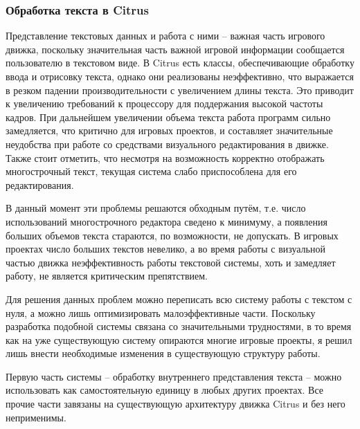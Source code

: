 \documentclass{fefu}
\begin{document}
			\subsubsection{Обработка текста в Citrus}
				\par Представление текстовых данных и работа с ними -- важная часть игрового
				движка, поскольку значительная часть важной игровой информации сообщается 
				пользователю в текстовом виде. 
				В Citrus есть классы, обеспечивающие обработку ввода и отрисовку текста, 
				однако они реализованы неэффективно, что выражается в резком падении 
				производительности с увеличением длины текста. Это приводит к увеличению
				требований к процессору для поддержания высокой частоты кадров. При дальнейшем
				увеличении объема текста работа программ сильно замедляется, что критично для
				игровых проектов, и составляет значительные неудобства при работе со средствами
				визуального редактирования в движке. Также стоит отметить, что несмотря на
				возможность корректно отображать многострочный текст, текущая система слабо
				приспособлена для его редактирования.
				\par В данный момент эти проблемы решаются обходным путём, т.е. число
				использований многострочного редактора сведено к минимуму, а появления больших
				объемов текста стараются, по возможности, не допускать. В игровых проектах
				число больших текстов невелико, а во время работы с визуальной частью движка
				неэффективность работы текстовой системы, хоть и замедляет работу, не является
				критическим препятствием.
				\par Для решения данных проблем можно переписать всю систему работы с текстом с
				нуля, а можно лишь оптимизировать малоэффективные части. Поскольку разработка 
				подобной системы связана со значительными трудностями, в то время как на уже
				существующую систему опираются многие игровые проекты, я решил лишь внести 
				необходимые изменения в существующую структуру работы.
				\par Первую часть системы -- обработку внутреннего представления текста -- 
				можно использовать как самостоятельную единицу в любых других проектах. Все 
				прочие части завязаны на существующую архитектуру движка Citrus и без него 
				неприменимы.
\end{document}
